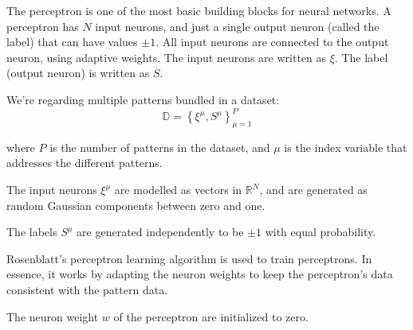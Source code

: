 The perceptron is one of the most basic building blocks for neural networks.
A perceptron has \(N\) input neurons, and just a single output neuron (called the label) that can have values \(\pm1\).
All input neurons are connected to the output neuron, using adaptive weights.
The input neurons are written as \(\xi\).
The label (output neuron) is written as \(S\).

We're regarding multiple patterns bundled in a dataset:
\[ \mathbb{D} = \left\{ \xi^\mu, S^\mu \right\} _{\mu=1}^{P} \]

where \(P\) is the number of patterns in the dataset, and \(\mu\) is the index variable that addresses the different patterns.

The input neurons \(\xi^\mu\) are modelled as vectors in \(\mathbb{R}^N\), and are generated as random Gaussian components between zero and one.

The labels \(S^\mu\) are generated independently to be \(\pm1\) with equal probability.

Rosenblatt's perceptron learning algorithm\cite{rosenblatt1958perceptron} is used to train perceptrons.
In essence, it works by adapting the neuron weights to keep the perceptron's data consistent with the pattern data.

The neuron weight \(w\) of the perceptron are initialized to zero.